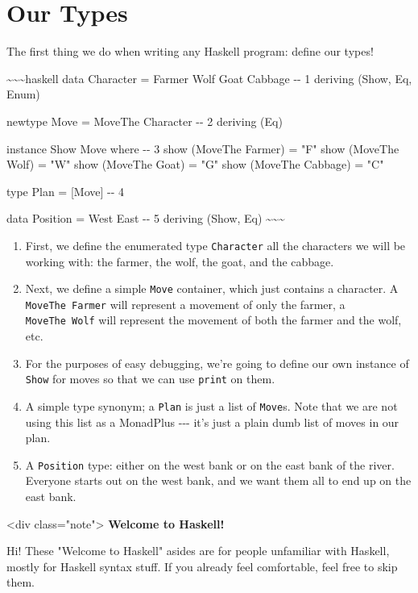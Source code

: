 \documentclass[]{article}
\begin{document}
\section{Our Types}

The first thing we do when writing any Haskell program: define our types!

\textasciitilde{}\textasciitilde{}\textasciitilde{}haskell data Character =
Farmer \textbar{} Wolf \textbar{} Goat \textbar{} Cabbage -\/- 1 deriving (Show,
Eq, Enum)

newtype Move = MoveThe Character -\/- 2 deriving (Eq)

instance Show Move where -\/- 3 show (MoveThe Farmer) = "F" show (MoveThe Wolf)
= "W" show (MoveThe Goat) = "G" show (MoveThe Cabbage) = "C"

type Plan = {[}Move{]} -\/- 4

data Position = West \textbar{} East -\/- 5 deriving (Show, Eq)
\textasciitilde{}\textasciitilde{}\textasciitilde{}

\begin{enumerate}
\tightlist
\item
  First, we define the enumerated type \texttt{Character} all the characters we
  will be working with: the farmer, the wolf, the goat, and the cabbage.
\item
  Next, we define a simple \texttt{Move} container, which just contains a
  character. A \texttt{MoveThe\ Farmer} will represent a movement of only the
  farmer, a \texttt{MoveThe\ Wolf} will represent the movement of both the
  farmer and the wolf, etc.
\item
  For the purposes of easy debugging, we're going to define our own instance of
  \texttt{Show} for moves so that we can use \texttt{print} on them.
\item
  A simple type synonym; a \texttt{Plan} is just a list of \texttt{Move}s. Note
  that we are not using this list as a MonadPlus -\/-\/- it's just a plain dumb
  list of moves in our plan.
\item
  A \texttt{Position} type: either on the west bank or on the east bank of the
  river. Everyone starts out on the west bank, and we want them all to end up on
  the east bank.
\end{enumerate}

\textless{}div class="note"\textgreater{} \textbf{Welcome to Haskell!}

Hi! These "Welcome to Haskell" asides are for people unfamiliar with Haskell,
mostly for Haskell syntax stuff. If you already feel comfortable, feel free to
skip them.
\end{document}
